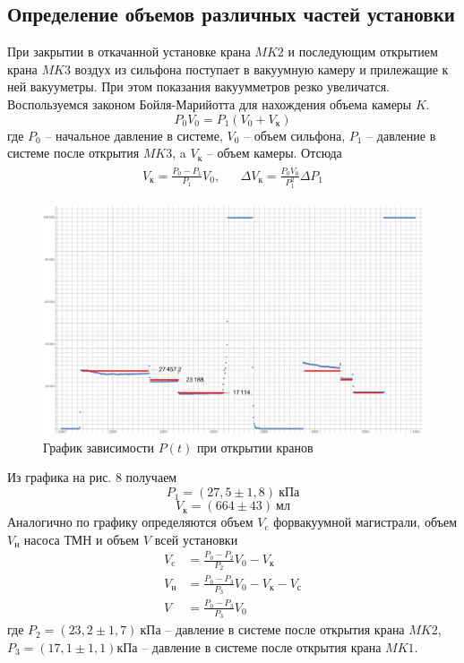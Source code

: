 \documentclass[a4paper,12pt]{article}
\theoremstyle{plain} %
\theoremstyle{definition} %
\theoremstyle{remark} %
\begin{document}
\subsection{Определение объемов различных частей установки}
При закрытии в откачанной установке крана $MK2$ и последующим открытием крана $MK3$ воздух из сильфона поступает в вакуумную камеру и прилежащие к ней вакууметры. При этом показания вакуумметров резко увеличатся. Воспользуемся законом Бойля-Марийотта для нахождения объема камеры $K$.
\[P_0V_0 = P_1(V_0 +V_\text{к})\]
где $P_0$ -- начальное давление в системе, $V_0$ -- объем сильфона, $P_1$ -- давление в системе после открытия $MK3$, a $V_\text{к}$ -- объем камеры. Отсюда
\begin{align*}
\begin{aligned}
V_\text{к} = \frac{P_0 - P_1}{P_1}V_0, & &\Delta V_\text{к}= \frac{P_0V_0}{P_1^2}\Delta P_1
\end{aligned}
\end{align*}
\begin{figure}[H]
	\begin{center}
		\includegraphics[width=\linewidth]{11}
		\caption{График зависимости $P(t)$ при открытии кранов}
	\end{center}
\end{figure}
Из графика на рис. 8 получаем 
\[P_1 = (27,5 \pm 1,8)\ \text{кПа}\]
\[V_\text{к} = (664 \pm 43)\ \text{мл}\]
Аналогично по графику определяются объем $V_\text{c}$ форвакуумной магистрали, объем $V_\text{н}$ насоса ТМН и объем $V$ всей установки
\begin{align*}
V_\text{c} &= \frac{P_0 - P_2}{P_2}V_0-V_\text{к}\\
V_\text{н} &= \frac{P_0 - P_3}{P_3}V_0-V_\text{к} - V_\text{с}\\
V &= \frac{P_0 - P_3}{P_3}V_0
\end{align*}
где $P_2 = (23,2 \pm 1,7)\ \text{кПа}$ -- давление в системе после открытия крана $MK2$,\\ $P_3=(17,1\pm 1,1)\text{кПа}$ -- давление в системе после открытия крана $MK1$. 
\end{document}
